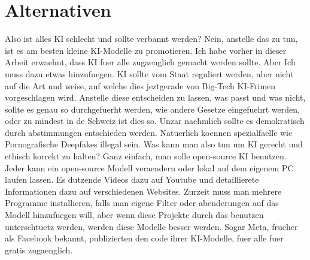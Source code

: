 \documentclass{report}
\begin{document}
\chapter{Alternativen}
Also ist alles KI schlecht und sollte verbannt werden? Nein, anstelle das zu tun, ist es am besten kleine KI-Modelle zu promotieren. Ich habe vorher in dieser Arbeit erwaehnt, dass KI fuer alle zugaenglich gemacht werden sollte. Aber Ich muss dazu etwas hinzufuegen. KI sollte vom Staat reguliert werden, aber nicht auf die Art und weise, auf welche dies jeztgerade von Big-Tech KI-Frimen vorgeschlagen wird. Anstelle diese entscheiden zu lassen, was passt und was nicht, sollte es genau so durchgefuerht werden, wie andere Gesetze eingefuehrt werden, oder zu mindest in de Schweiz ist dies so. Unzar naehmlich sollte es demokratisch durch abstimmungen entschieden werden. Natuerlich koennen spezialfaelle wie Pornografische Deepfakes illegal sein. 
\newline
\newline
Was kann man also tun um KI gerecht und ethisch korrekt zu halten? Ganz einfach, man solle open-source KI benutzen. Jeder kann ein open-source Modell veraendern oder lokal auf dem eigenem PC laufen lassen. Es dutzende Videos dazu auf Youtube und detaillierete Informationen dazu auf verschiedenen Websites. Zurzeit muss man mehrere Programme installieren, falls man eigene Filter oder abenderungen auf das Modell hinzufuegen will, aber wenn diese Projekte durch das benutzen unterschtuetz werden, werden diese Modelle besser werden. Sogar Meta, frueher als Facebook bekannt, publizierten den code ihrer KI-Modelle, fuer alle fuer gratis zugaenglich.
\printbibliography
\end{document}
